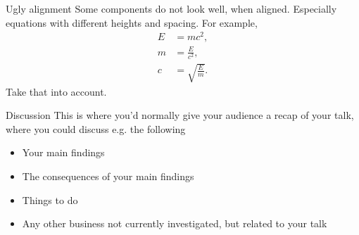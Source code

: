 \documentclass[aspectratio=169]{beamer}
\begin{document}
\begin{frame}{Ugly alignment}
Some components do not look well, when aligned. Especially equations with different heights and spacing. For example,
\begin{align}
E&=mc^2,\\
m&=\frac{E}{c^2},\\
c&=\sqrt{\frac{E}{m}}.
\end{align}
Take that into account.
\end{frame}

\begin{frame}{Discussion}
This is where you'd normally give your audience a recap of your talk, where you could discuss e.g. the following
\begin{itemize}
\item Your main findings
\item The consequences of your main findings
\item Things to do
\item Any other business not currently investigated, but related to your talk
\end{itemize}
\end{frame}
\end{document}
